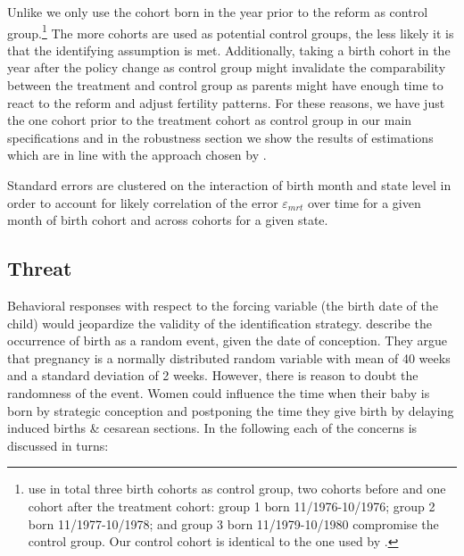 \documentclass[11pt, a4paper,draft]{article} %
\begin{document}
Unlike \cite{Dustmann2012} we only use the cohort born in the year prior to the reform as control group.\footnote{\cite{Dustmann2012} use in total three birth cohorts as control group, two cohorts before and one cohort after the treatment cohort: group 1 born 11/1976-10/1976; group 2 born 11/1977-10/1978; and group 3 born 11/1979-10/1980 compromise the control group. Our control cohort is identical to the one used by \cite{guertzgen2018}.} The more cohorts are used as potential control groups, the less likely it is that the identifying assumption is met. Additionally, taking a birth cohort in the year after the policy change as control group might invalidate the comparability between the treatment and control group as parents might have enough time to react to the reform and adjust fertility patterns. For these reasons, we have just the one cohort prior to the treatment cohort as control group in our main specifications and in the robustness section we show the results of estimations which are in line with the approach chosen by \cite{Dustmann2012}.\newline


Standard errors are clustered on the interaction of birth month and state level in order to account for likely correlation of the error $\varepsilon_{mrt}$ over time for a given month of birth cohort and across cohorts for a given state.







\newpage
\subsection{Threat}\label{sec:empirical_strategy_2threats}
Behavioral responses with respect to the forcing variable (the birth date of the child) would jeopardize the validity of the identification strategy. \cite{ekberg2013parental} describe the occurrence of birth as a random event, given the date of conception. They argue that pregnancy is a normally distributed random variable with mean of 40 weeks and a standard deviation of 2 weeks. However, there is reason to doubt the randomness of the event. \newline 
Women could influence the time when their baby is born by strategic conception and postponing the time they give birth by delaying induced births \& cesarean sections. In the following each of the concerns is discussed in turns: 
\end{document}
